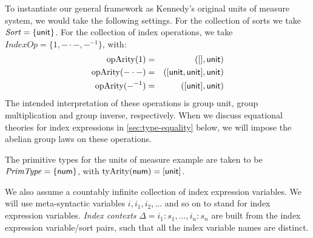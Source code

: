 \begin{example}
  To instantiate our general framework as Kennedy's original units
  of measure system, we would take the following settings. For the
  collection of sorts we take $\mathit{Sort} = \{ \mathsf{unit} \}$. For
  the collection of index operations, we take $\mathit{IndexOp} = \{1,
  -\cdot-, -^{-1}\}$, with:
  \begin{eqnarray*}
    \mathrm{opArity}{(1)} &=& ([],\mathsf{unit}) \\
    \mathrm{opArity}{(-\cdot-)} & = & ([\mathsf{unit},\mathsf{unit}],\mathsf{unit}) \\
    \mathrm{opArity}{(-^{-1})} & = & ([\mathsf{unit}],\mathsf{unit})
  \end{eqnarray*}
  The intended interpretation of these operations is group unit, group
  multiplication and group inverse, respectively. When we discuss
  equational theories for index expressions in
  \autoref{sec:type-equality} below, we will impose the abelian group
  laws on these operations.

  The primitive types for the units of measure example are taken to be
  $\mathit{PrimType} = \{ \mathsf{num} \}$, with
  $\mathrm{tyArity}(\mathsf{num}) = [\mathsf{unit}]$.
\end{example}

We also assume a countably infinite collection of index expression
variables. We will use meta-syntactic variables $i, i_1, i_2, ...$ and
so on to stand for index expression variables. \emph{Index contexts}
$\Delta = i_1 : s_1, ..., i_n : s_n$ are built from the index
expression variable/sort pairs, such that all the index variable names
are distinct.

